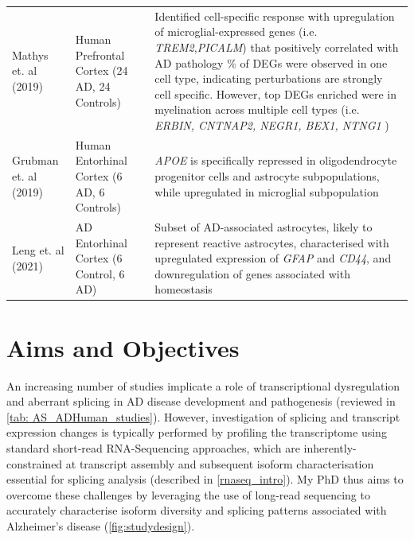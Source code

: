 \begin{changemargin}{1.5cm}
\begin{landscape}
\begin{longtable}[c]{p{4cm}p{4cm}p{18cm}}
			\centering Mathys et. al (2019)\cite{Mathys2019} &
			\centering Human Prefrontal Cortex (24 AD, 24 Controls)  &
			\tabitem Identified cell-specific response with upregulation of microglial-expressed genes (i.e. \textit{TREM2},\textit{PICALM}) that positively correlated with AD pathology \newline
			\tabitem 95\% of DEGs were observed in one cell type, indicating perturbations are strongly cell specific.  However, top DEGs enriched were in myelination across multiple cell types (i.e. \textit{ERBIN, CNTNAP2, NEGR1, BEX1, NTNG1} )   \\
			\hdashline[0.5pt/5pt]
			
			\centering Grubman et. al (2019)\cite{Grubman2019} &
			\centering Human Entorhinal Cortex (6 AD, 6 Controls)  &
			\tabitem \textit{APOE} is specifically repressed in oligodendrocyte progenitor cells and astrocyte subpopulations, while upregulated in microglial subpopulation  \\
			\hdashline[0.5pt/5pt]
			
			\centering Leng et. al (2021)\cite{Leng2021} &
			\centering AD Entorhinal Cortex (6 Control, 6 AD)  &
			\tabitem Subset of AD-associated astrocytes, likely to represent reactive astrocytes, characterised with upregulated expression of \textit{GFAP} and \textit{CD44}, and downregulation of genes associated with homeostasis  		
			\\* \bottomrule
		\end{longtable}
	\end{landscape}
\end{changemargin}


\newpage
\section{Aims and Objectives}
An increasing number of studies implicate a role of transcriptional dysregulation and aberrant splicing in AD disease development and pathogenesis (reviewed in \cref{tab: AS_ADHuman_studies}). However, investigation of splicing and transcript expression changes is typically performed by profiling the transcriptome using standard short-read RNA-Sequencing approaches, which are inherently-constrained at transcript assembly and subsequent isoform characterisation essential for splicing analysis (described in \cref{rnaseq_intro}). My PhD thus aims to overcome these challenges by leveraging the use of long-read sequencing to accurately characterise isoform diversity and splicing patterns associated with Alzheimer's disease (\cref{fig:studydesign}).

